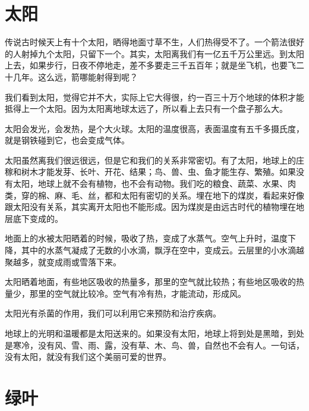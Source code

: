 \documentclass[12pt,UTF-8,openany]{ctexbook}
\begin{document}
\chapter{太阳}

\begin{Large}
    
    传说古时候天上有十个太阳，晒得地面寸草不生，人们热得受不了。一个箭法很好的人射掉九个太阳，只留下一个。其实，太阳离我们有一亿五千万公里远。到太阳上去，如果步行，日夜不停地走，差不多要走三千五百年；就是坐飞机，也要飞二十几年。这么远，箭哪能射得到呢？
    
    我们看到太阳，觉得它并不大，实际上它大得很，约一百三十万个地球的体积才能抵得上一个太阳。因为太阳离地球太远了，所以看上去只有一个盘子那么大。
    
    太阳会发光，会发热，是个大火球。太阳的温度很高，表面温度有五千多摄氏度，就是钢铁碰到它，也会变成气体。
    
    太阳虽然离我们很远很远，但是它和我们的关系非常密切。有了太阳，地球上的庄稼和树木才能发芽、长叶、开花、结果；鸟、兽、虫、鱼才能生存、繁殖。如果没有太阳，地球上就不会有植物，也不会有动物。我们吃的粮食、蔬菜、水果、肉类，穿的棉、麻、毛、丝，都和太阳有密切的关系。埋在地下的煤炭，看起来好像跟太阳没有关系，其实离开太阳也不能形成。因为煤炭是由远古时代的植物埋在地层底下变成的。
    
    地面上的水被太阳晒着的时候，吸收了热，变成了水蒸气。空气上升时，温度下降，其中的水蒸气凝成了无数的小水滴，飘浮在空中，变成云。云层里的小水滴越聚越多，就变成雨或雪落下来。
    
    太阳晒着地面，有些地区吸收的热量多，那里的空气就比较热；有些地区吸收的热量少，那里的空气就比较冷。空气有冷有热，才能流动，形成风。
    
    太阳光有杀菌的作用，我们可以利用它来预防和治疗疾病。
    
    地球上的光明和温暖都是太阳送来的。如果没有太阳，地球上将到处是黑暗，到处是寒冷，没有风、雪、雨、露，没有草、木、鸟、兽，自然也不会有人。一句话，没有太阳，就没有我们这个美丽可爱的世界。
    
\end{Large}

\chapter{绿叶}
\end{document}
